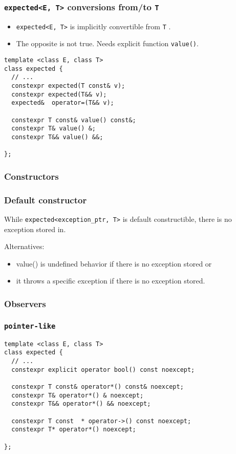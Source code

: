 \documentclass[xcolor=dvipsnames]{beamer}
\newcommand{\cpp}[1]{\lstinline{#1}}
\begin{document}
\begin{frame}[fragile]
\frametitle{\cpp{expected<E, T>} conversions from/to \cpp{T}}

\begin{itemize}
\item \cpp{expected<E, T>} is implicitly convertible from \cpp{T} .
\item The opposite is not true. Needs explicit function \cpp{value()}.
\end{itemize}

\begin{lstlisting}
template <class E, class T>
class expected {
  // ...
  constexpr expected(T const& v);
  constexpr expected(T&& v);
  expected&  operator=(T&& v);
  
  constexpr T const& value() const&;
  constexpr T& value() &;
  constexpr T&& value() &&;
  
};
\end{lstlisting}

\end{frame}
\subsubsection{Constructors}
\begin{frame}[fragile]
\frametitle{Default constructor}
While \cpp{expected<exception_ptr, T>} is default constructible, there is no exception stored in.

Alternatives: 

\begin{itemize}
\item value() is undefined behavior if there is no exception stored or 
\item it throws a specific exception if there is no exception stored.
\end{itemize}

\end{frame}
\subsubsection{Observers}
\begin{frame}[fragile]
\frametitle{\cpp{pointer-like}}

\begin{lstlisting}
template <class E, class T>
class expected {
  // ...
  constexpr explicit operator bool() const noexcept;

  constexpr T const& operator*() const& noexcept;
  constexpr T& operator*() & noexcept; 
  constexpr T&& operator*() && noexcept; 

  constexpr T const  * operator->() const noexcept;
  constexpr T* operator*() noexcept; 
  
};
\end{lstlisting}

\end{frame}
\end{document}
